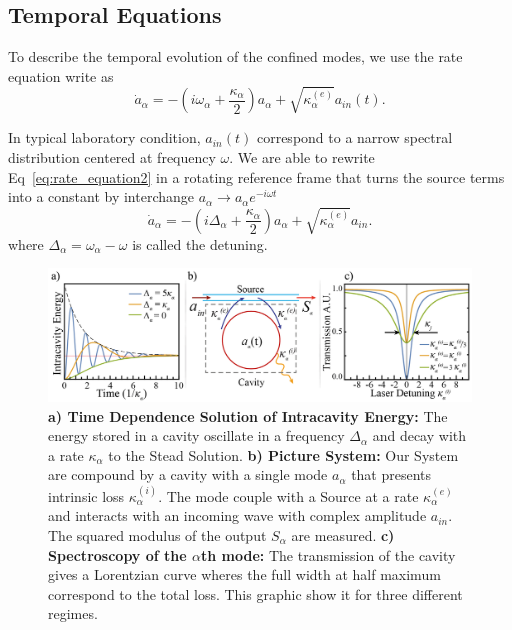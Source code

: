 \subsection{Temporal Equations}

To describe the temporal evolution of the confined modes, we use the rate equation write as 
\begin{equation}
    \dot{a}_\alpha = -\left(i\omega_\alpha +\frac{\kappa_\alpha}{2}\right)a_\alpha +\sqrt{\kappa^{(e)}_\alpha}a_{in}(t).
    \label{eq:rate_equation2}
\end{equation} 

In typical laboratory condition, $a_{in}(t)$ correspond to a narrow spectral distribution centered at frequency $\omega$. We are able to rewrite Eq~\ref{eq:rate_equation2} in a rotating reference frame that turns the source terms into a constant by interchange $a_\alpha \rightarrow a_\alpha e^{-i\omega t}$
\begin{equation}
    \dot{a}_\alpha = -\left(i\Delta_\alpha +\frac{\kappa_\alpha}{2}\right)a_\alpha +\sqrt{\kappa^{(e)}_\alpha}a_{in}.
    \label{eq:rate_equation_unperturbed}
\end{equation}
where $\Delta_\alpha = \omega_\alpha - \omega$ is called the detuning.
\begin{figure}[t!]
    \centering
    \includegraphics[width = 16cm]{Dissertation_rate_equation.jpg}
    \caption{\textbf{a) Time Dependence Solution of Intracavity Energy:} The energy stored in a cavity oscillate in a frequency $\Delta_\alpha$ and decay with a rate $\kappa_\alpha$ to the Stead Solution. \textbf{b) Picture System:} Our System are compound by a cavity with a single mode $a_\alpha$ that presents intrinsic loss $\kappa_\alpha^{(i)}$. The mode couple with a Source at a rate $\kappa_\alpha^{(e)}$ and interacts with an incoming wave with complex amplitude $a_{in}$. The squared modulus of the output $S_\alpha$ are measured. \textbf{c) Spectroscopy of the $\alpha$th mode:} The transmission of the cavity gives a Lorentzian curve wheres the full width at half maximum correspond to the total loss. This graphic show it for three different regimes.}
    \label{fig:rate_equations_single_mode}
\end{figure}

